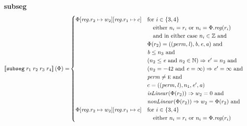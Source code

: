 \documentclass[a4paper]{article}
\newcommand{\sem}[1]{\left\llbracket #1 \right\rrbracket}
\newcommand{\tand}{\text{ and }}
\newcommand{\targetcolor}[1]{\color{black}}
\newcommand{\trg}[1]{{\targetcolor{} #1}}
\newcommand{\zinstr}[1]{\texttt{#1}}
\newcommand{\fourinstr}[5]{
  \ifthenelse{\equal{#2#3#4#5}{}}
  {\zinstr{#1}}
  {\zinstr{#1} \; #2 \; #3 \; #4 \; #5}
}
\newcommand{\tsubseg}[4]{\fourinstr{\trg{subseg}}{#1}{#2}{#3}{#4}}
\newcommand{\nats}{\mathbb{N}}
\newcommand{\ints}{\mathbb{Z}}
\newcommand{\update}[2]{[#1 \mapsto #2]}
\newcommand{\updReg}[2]{\update{\reg.#1}{#2}}
\newcommand{\perm}{\var{perm}}
\newcommand{\lin}{\var{l}}
\newcommand{\var}[1]{\mathit{#1}}
\newcommand{\reg}{\var{reg}}
\newcommand{\baddr}{\var{b}}
\newcommand{\eaddr}{\var{e}}
\newcommand{\aaddr}{\var{a}}
\newcommand{\plainperm}[1]{\textsc{#1}}
\newcommand{\enter}{\plainperm{e}}
\newcommand{\plainfun}[2]{
  \ifthenelse{\equal{#2}{}}
  {\mathit{#1}}
  {\mathit{#1}(#2)}
}
\newcommand{\nonLinear}[1]{\plainfun{nonLinear}{#1}}
\newcommand{\isLinear}[1]{\plainfun{isLinear}{#1}}
\begin{document}
\noindent\textbf{subseg}\\
\begin{align*}
  \sem{\tsubseg{r_1}{r_2}{r_3}{r_4}}(\Phi) = &
                                               \begin{cases}
                                                 \Phi\updReg{r_2}{w_2}\updReg{r_1}{c} &
                                                 \arraycolsep=0pt
                                                 \begin{array}[t]{l}
                                                   \text{for $i \in \{3, 4\}$ } \\
                                                   \quad \text{either $n_i = r_i$ or $n_i = \Phi.\reg(r_i)$}\\
                                                   \quad \text{and in either case $n_i \in \ints$ and} \\
                                                   \Phi(r_2) = ((\perm,\lin),\baddr,\eaddr,\aaddr) \tand \\
                                                   \baddr \leq n_3 \tand \\
                                                   (n_2 \leq \eaddr \tand n_2 \in \nats) \Rightarrow \eaddr' = n_2 \tand \\
                                                   (n_2 = -42 \tand \eaddr = \infty) \Rightarrow \eaddr' = \infty \tand\\
                                                   \perm \neq \enter \tand\\
                                                   c = ((\perm,\lin),n_1,\eaddr',\aaddr)\\
                                                   \isLinear{\Phi(r_2)} \Rightarrow w_2 = 0 \tand \\
                                                   \nonLinear{\Phi(r_2)} \Rightarrow w_2 = \Phi(r_2) \tand
                                                 \end{array}
\\
                                                 \Phi\updReg{r_2}{w_2}\updReg{r_1}{c} &
                                                 \arraycolsep=0pt
                                                 \begin{array}[t]{l}
                                                   \text{for $i \in \{3, 4\}$ } \\
                                                   \quad \text{either $n_i = r_i$ or $n_i = \Phi.\reg(r_i)$}\\

\end{array}
\end{cases}
\end{align*}
\end{document}
